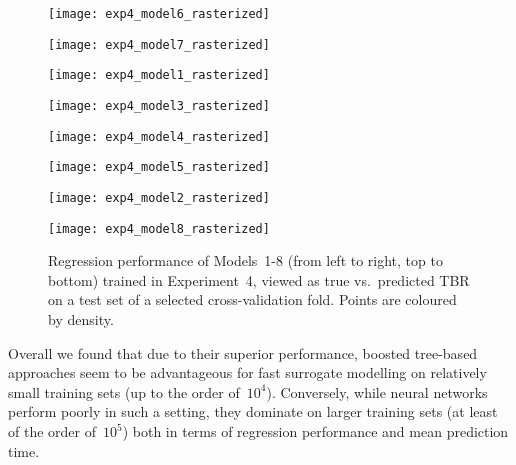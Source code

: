 \begin{figure}
	\centering
	\begin{minipage}{0.5\linewidth}
		\centering
		\texttt{[image: exp4\_model6\_rasterized]}
	\end{minipage}\hfill%
	\begin{minipage}{0.5\linewidth}
		\centering
		\texttt{[image: exp4\_model7\_rasterized]}
	\end{minipage}

	\begin{minipage}{0.5\linewidth}
		\centering
		\texttt{[image: exp4\_model1\_rasterized]}
	\end{minipage}\hfill%
	\begin{minipage}{0.5\linewidth}
		\centering
		\texttt{[image: exp4\_model3\_rasterized]}
	\end{minipage}

	\begin{minipage}{0.5\linewidth}
		\centering
		\texttt{[image: exp4\_model4\_rasterized]}
	\end{minipage}\hfill%
	\begin{minipage}{0.5\linewidth}
		\centering
		\texttt{[image: exp4\_model5\_rasterized]}
	\end{minipage}

	\begin{minipage}{0.5\linewidth}
		\centering
		\texttt{[image: exp4\_model2\_rasterized]}
	\end{minipage}\hfill%
	\begin{minipage}{0.5\linewidth}
		\centering
		\texttt{[image: exp4\_model8\_rasterized]}
	\end{minipage}

	\caption{Regression performance of Models~1-8 (from left to right, top to
		bottom) trained in Experiment~4, viewed
		as true vs.~predicted TBR on a test set of a selected cross-validation
		fold. Points are coloured by density.}
	\label{fig:reg-performance}
\end{figure}

Overall we found that due to their superior performance, boosted tree-based
approaches seem to be advantageous for fast surrogate modelling on relatively small training
sets (up to the order of~$10^4$). Conversely, while neural networks perform
poorly in such a setting, they dominate on larger training sets (at least of the
order of~$10^5$) both in terms of regression performance and mean prediction time.

